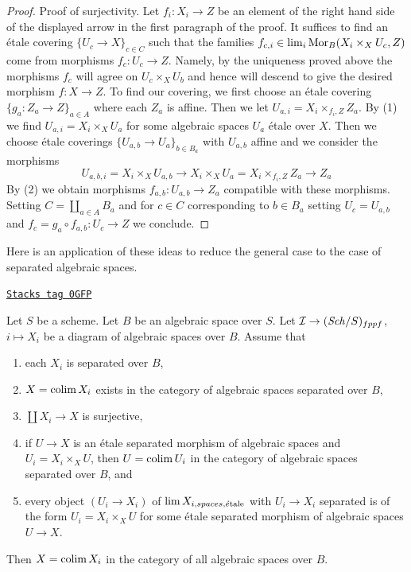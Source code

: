 \begin{proof}
\medskip\noindent
Proof of surjectivity. Let $f_i : X_i \to Z$ be an element of the
right hand side of the displayed arrow in the first paragraph of the proof.
It suffices to find an \'etale covering $\{U_c \to X\}_{c \in C}$
such that the families $f_{c, i} \in \lim_i \operatorname{Mor}_B(X_i \times_X U_c, Z)$
come from morphisms $f_c : U_c \to Z$. Namely, by the uniqueness
proved above the morphisms $f_c$ will agree on $U_c \times_X U_b$
and hence will descend to give the desired morphism $f : X \to Z$.
To find our covering, we first choose an \'etale covering
$\{g_a : Z_a \to Z\}_{a \in A}$ where each $Z_a$ is affine. Then we let
$U_{a, i} = X_i \times_{f_i, Z} Z_a$. By (1) we find
$U_{a, i} = X_i \times_X U_a$ for some algebraic spaces $U_a$ \'etale
over $X$. Then we choose \'etale coverings
$\{U_{a, b} \to U_a\}_{b \in B_a}$
with $U_{a, b}$ affine and we consider the morphisms
$$
U_{a, b, i} = X_i \times_X U_{a, b} \to
X_i \times_X U_a = X_i \times_{f_i, Z} Z_a \to Z_a
$$
By (2) we obtain morphisms $f_{a, b} : U_{a, b} \to Z_a$ compatible with these
morphisms. Setting $C = \coprod_{a \in A} B_a$ and for $c \in C$
corresponding to $b \in B_a$ setting $U_c = U_{a, b}$ and
$f_c = g_a \circ f_{a, b} : U_c \to Z$ we conclude.
\end{proof}

Here is an application of these ideas to reduce the general case
to the case of separated algebraic spaces.

\begin{lemma}
\label{spaces-pushouts-lemma-colimit-separated-enough}
\href{https://stacks.math.columbia.edu/tag/0GFP}{\texttt{Stacks tag 0GFP}}

Let $S$ be a scheme. Let $B$ be an algebraic space over $S$.
Let $\mathcal{I} \to (\mathit{Sch}/S)_{fppf}$, $i \mapsto X_i$
be a diagram of algebraic spaces over $B$. Assume that
\begin{enumerate}
\item each $X_i$ is separated over $B$,
\item $X = \operatorname{colim} X_i$ exists in the category of
algebraic spaces separated over $B$,
\item $\coprod X_i \to X$ is surjective,
\item if $U \to X$ is an \'etale separated morphism of algebraic spaces and
$U_i = X_i \times_X U$, then $U = \operatorname{colim} U_i$ in
the category of algebraic spaces separated over $B$, and
\item every object $(U_i \to X_i)$ of $\lim X_{i, spaces, \acute{e}\text{tale}}$
with $U_i \to X_i$ separated is of the form $U_i = X_i \times_X U$
for some \'etale separated morphism of algebraic spaces $U \to X$.
\end{enumerate}
Then $X = \operatorname{colim} X_i$ in the category of all algebraic spaces over $B$.
\end{lemma}

